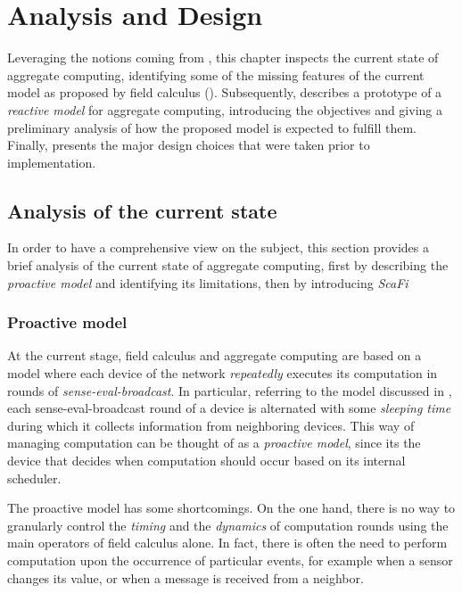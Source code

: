 \chapter{Analysis and Design}
\label{chap:analysis-design}

Leveraging the notions coming from , this chapter inspects the current state of aggregate computing, identifying some of the missing features of the current model as proposed by field calculus ().
%
Subsequently,  describes a prototype of a \textit{reactive model} for aggregate computing, introducing the objectives and giving a preliminary analysis of how the proposed model is expected to fulfill them.
%
Finally,  presents the major design choices that were taken prior to implementation.

\section{Analysis of the current state}
\label{sec:current-state}

In order to have a comprehensive view on the subject, this section provides a brief analysis of the current state of aggregate computing, first by describing the \textit{proactive model} and identifying its limitations, then by introducing \textit{ScaFi}

\subsection{Proactive model}

At the current stage, field calculus and aggregate computing are based on a model where each device of the network \textit{repeatedly} executes its computation in rounds of \textit{sense-eval-broadcast}.
%
In particular, referring to the model discussed in \cite{10.1145/3177774}, each sense-eval-broadcast round of a device is alternated with some \textit{sleeping time} during which it collects information from neighboring devices.
%
This way of managing computation can be thought of as a \textit{proactive model}, since its the device that decides when computation should occur based on its internal scheduler.

The proactive model has some shortcomings.
%
On the one hand, there is no way to granularly control the \textit{timing} and the \textit{dynamics} of computation rounds using the main operators of field calculus alone.
%
In fact, there is often the need to perform computation upon the occurrence of particular events, for example when a sensor changes its value, or when a message is received from a neighbor.


